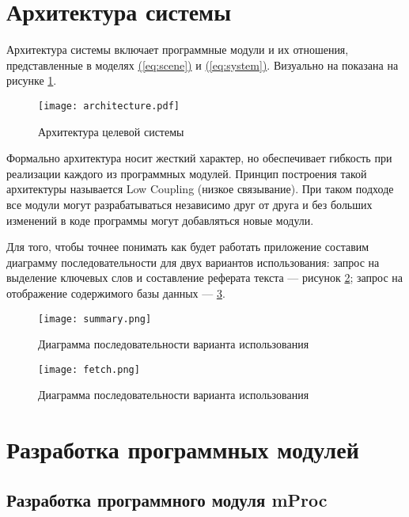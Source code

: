\section{Архитектура системы}

Архитектура системы включает программные модули и их отношения, представленные в моделях \hyperref[eq:scene]{(\ref{eq:scene})} и \hyperref[eq:system]{(\ref{eq:system})}. Визуально на показана на рисунке \hyperref[fig:arch]{\ref{fig:arch}}.

\begin{figure}[H]
\centering
\texttt{[image: architecture.pdf]}
\caption{Архитектура целевой системы}
\label{fig:arch}
\end{figure}

Формально архитектура носит жесткий характер, но обеспечивает гибкость при реализации каждого из программных модулей. Принцип построения такой архитектуры называется Low Coupling (низкое связывание). При таком подходе все модули могут разрабатываться независимо друг от друга и без больших изменений в коде программы могут добавляться новые модули.

Для того, чтобы точнее понимать как будет работать приложение составим диаграмму последовательности для двух вариантов использования: запрос на выделение ключевых слов и составление реферата текста --- рисунок \hyperref[fig:extract]{\ref{fig:extract}}; запрос на отображение содержимого базы данных --- \hyperref[fig:fetch]{\ref{fig:fetch}}.

\begin{figure}[H]
\centering
\texttt{[image: summary.png]}
\caption{Диаграмма последовательности варианта использования }
\label{fig:extract}
\end{figure}

\begin{figure}[H]
\centering
\texttt{[image: fetch.png]}
\caption{Диаграмма последовательности варианта использования }
\label{fig:fetch}
\end{figure}

\section{Разработка программных модулей}

\subsection{Разработка программного модуля mProc}

